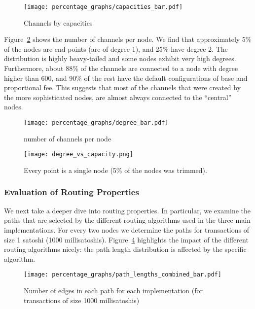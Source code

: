     \begin{figure}
    	\centering
    	\texttt{[image: percentage\_graphs/capacities\_bar.pdf]}
    	\caption{Channels by capacities}
    	\label{figure::capacity}
    \end{figure}

Figure~\ref{figure::degree} shows the number of channels per node.
We find that approximately 
5\% of the nodes are end-points (are of degree 1), and
25\% have degree 2.
The distribution is highly heavy-tailed and some nodes
exhibit very high degrees. Furthermore, about 88\% of the channels are connected to a node with degree higher than 600, and 90\% of the rest have the default configurations of base and proportional fee. This suggests that most of the channels that were created by the more sophisticated nodes, are almost always connected to the ``central'' nodes.

    
    \begin{figure}
    	\centering
    	\texttt{[image: percentage\_graphs/degree\_bar.pdf]}
    	\caption{number of channels per node}
    	\label{figure::degree}
    \end{figure}

    
    \begin{figure} 
    	\centering
    	\texttt{[image: degree\_vs\_capacity.png]}
    	\caption{Every point is a single node (5\% of the nodes was trimmed).}
    	\label{figure::degree_vs_capacity}
    \end{figure}
    
    
\subsubsection{Evaluation of Routing Properties}
    
We next take a deeper dive into routing properties. 
In particular, we examine the paths that are selected by the 
different routing algorithms used in the three main implementations. 
For every two nodes we determine the paths for 
transactions of size 1 satoshi (1000 millisatoshis).
Figure~\ref{figure::path_lengths} highlights the impact 
of the different routing algorithms nicely:
the path length distribution is affected by the specific algorithm. 

    \begin{figure} 
    	\centering
    	\texttt{[image: percentage\_graphs/path\_lengths\_combined\_bar.pdf]}
    	\caption{Number of edges in each path for each implementation (for transactions of size 1000 millisatoshis)}
    	\label{figure::path_lengths}
    \end{figure}

